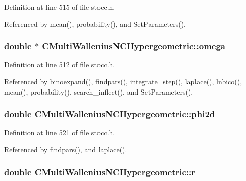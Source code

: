 Definition at line 515 of file stocc.\-h.



Referenced by mean(), probability(), and Set\-Parameters().

\subsubsection[{omega}]{\setlength{\rightskip}{0pt plus 5cm}double $\ast$ C\-Multi\-Wallenius\-N\-C\-Hypergeometric\-::omega\hspace{0.3cm}{\ttfamily [protected]}}\label{class_c_multi_wallenius_n_c_hypergeometric_a114ce3cebe3ff6668626d3deade4fb55}


Definition at line 512 of file stocc.\-h.



Referenced by binoexpand(), findpars(), integrate\-\_\-step(), laplace(), lnbico(), mean(), probability(), search\-\_\-inflect(), and Set\-Parameters().

\subsubsection[{phi2d}]{\setlength{\rightskip}{0pt plus 5cm}double C\-Multi\-Wallenius\-N\-C\-Hypergeometric\-::phi2d\hspace{0.3cm}{\ttfamily [protected]}}\label{class_c_multi_wallenius_n_c_hypergeometric_aeecc19a2188f0135418f8b1c36c3f198}


Definition at line 521 of file stocc.\-h.



Referenced by findpars(), and laplace().

\subsubsection[{r}]{\setlength{\rightskip}{0pt plus 5cm}double C\-Multi\-Wallenius\-N\-C\-Hypergeometric\-::r\hspace{0.3cm}{\ttfamily [protected]}}\label{class_c_multi_wallenius_n_c_hypergeometric_a2aea3eb2194c6c3a3b460f3c5a6e5137}


